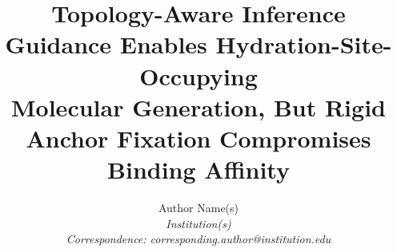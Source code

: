 \documentclass[11pt,letterpaper]{article}
\begin{document}
\title{Topology-Aware Inference Guidance Enables Hydration-Site-Occupying\\
       Molecular Generation, But Rigid Anchor Fixation Compromises\\
       Binding Affinity}

\author{Author Name(s)\\[3pt]
        \small\textit{Institution(s)}\\[3pt]
        \small\textit{Correspondence: corresponding.author@institution.edu}}

\date{}

\maketitle

\end{document}
